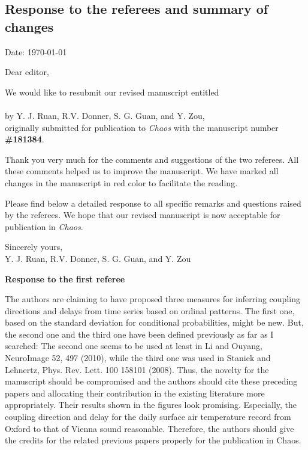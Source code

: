 \documentclass[aps,chaos,superscriptaddress,showkeys]{revtex4}
\begin{document}
\begin{center}
\section*{ \Large {Response to the referees and summary of changes} }
Date: {\today}
\end{center}

\noindent Dear editor,

\vspace{0.6cm}
We would like to resubmit our revised manuscript entitled \\

 \\

\noindent by Y. J. Ruan, R.V. Donner, S. G. Guan, and Y. Zou, \\

\noindent originally submitted for publication to \emph{Chaos} with the manuscript number {\bf \#181384}.

\vspace{0.6cm}
Thank you very much for the comments and suggestions of the two referees. All these comments helped us to improve the manuscript. We have marked all changes in the manuscript in red color to facilitate the reading.

\vspace{0.6cm}

Please find below a detailed response to all specific remarks and questions raised by the referees. We hope that our revised manuscript is now acceptable for publication in \emph{Chaos}.

\vspace{0.6cm}
\noindent
Sincerely yours,\\

\vspace{0.1cm}
\noindent
Y. J. Ruan, R.V. Donner, S. G. Guan, and Y. Zou


\newpage
\begin{center}
{\bf Response to the first referee}
\end{center}


{\sf The authors are claiming to have proposed three measures for inferring coupling directions and delays from time series based on ordinal patterns. The first one, based on the standard deviation for conditional probabilities, might be new. But, the second one and the third one have been defined previously as far as I searched: The second one seems to be used at least in Li and Ouyang, NeuroImage 52, 497 (2010), while the third one was used in Staniek and Lehnertz, Phys. Rev. Lett. 100 158101 (2008). Thus, the novelty for the manuscript should be compromised and the authors should cite these preceding papers and allocating their contribution in the existing literature more appropriately. Their results shown in the figures look promising. Especially, the coupling direction and delay for the daily surface air temperature record from Oxford to that of Vienna sound reasonable. Therefore, the authors should give the credits for the related previous papers properly for the publication in Chaos. }
\end{document}
